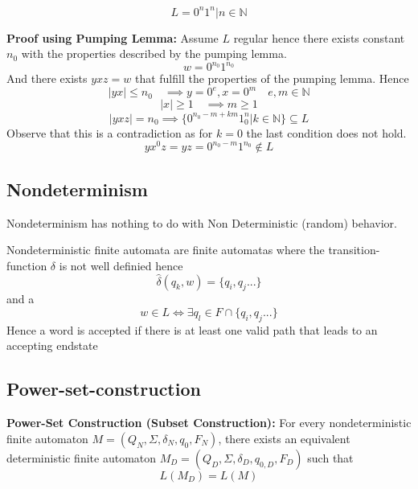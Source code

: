 \begin{example}
    $$
        L = {0^n 1^n | n \in \mathbb{N}}
    $$

    \textbf{Proof using Pumping Lemma:} Assume $L$ regular hence there exists
    constant $n_0$ with the properties described by the pumping lemma.
    $$
        w = 0^{n_0} 1^{n_0}
    $$
    And there exists $yxz = w$ that fulfill the properties of the pumping lemma.
    Hence
    $$
        |yx| \le n_0 \quad \implies y = 0^e, x = 0^m \quad e,m \in \mathbb{N}
    $$
    $$
        |x| \ge 1 \quad \implies m \ge 1
    $$
    $$
        |yxz| =         n_0
              \implies  \{0^{n_0-m+km} 1^n_0 | k \in \mathbb{N} \}
              \subseteq L
    $$
    Observe that this is a contradiction as for $k = 0$ the last condition does
    not hold.
    $$
        yx^0z = yz = 0^{n_0-m}1^{n_0} \notin L
    $$
\end{example}

\subsection{Nondeterminism}

\begin{important}
    Nondeterminism has nothing to do with Non Deterministic (random) behavior.
\end{important}

\begin{definition}
    Nondeterministic finite automata are finite automatas where the
    transition-function $\delta$ is not well definied hence
    $$
        \hat{\delta}(q_k, w) = \{q_i, q_j ...\}
    $$
    and a
    $$
        w \in L \iff \exists q_l \in F \cap \{q_i, q_j ...\}
    $$
    Hence a word is accepted if there is at least one valid path that leads to
    an accepting endstate
\end{definition}

\subsection{Power-set-construction}

\begin{theorem}
    \textbf{Power-Set Construction (Subset Construction):} For every
    nondeterministic finite automaton $M = (Q_N, \Sigma, \delta_N, q_0, F_N)$,
    there exists an equivalent deterministic finite automaton
    $M_D = (Q_D, \Sigma, \delta_D, q_{0,D}, F_D)$ such that
    $$
        L(M_D) = L(M)
    $$
\end{theorem}

